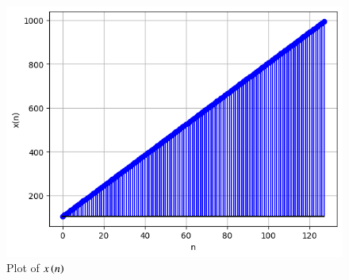 \documentclass[journal,12pt,twocolumn]{IEEEtran}
\theoremstyle{remark}
\begin{document}
\begin{figure}[!ht]
\centering
\begin{center}
\includegraphics[width=\columnwidth]{ncert-maths/10/5/2/13/figs/Fig1.png}
\caption{Plot of $x\brak{n}$}
\end{center}
\end{figure}
	
\end{document}
